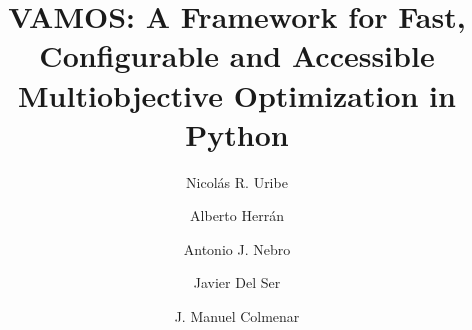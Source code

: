 \documentclass[final,5p,times,twocolumn]{elsarticle}
\begin{document}
\begin{frontmatter}

\title{VAMOS: A Framework for Fast, Configurable and Accessible Multiobjective Optimization in Python}



\author[URJC,cor]{Nicol\'{a}s R. Uribe}

\author[URJC]{Alberto Herr\'{a}n}

\author[LCC,ITIS]{Antonio J. Nebro}

\author[tec,upv]{Javier {Del Ser}}

\author[URJC,cor]{J. Manuel Colmenar}

\address[URJC]{Dept. Computer Sciences, Universidad Rey Juan Carlos\\
C/. Tulip\'{a}n, s/n, M\'{o}stoles, 28933 (Madrid), Spain}

\address[LCC]{Dept. de Lenguajes y Ciencias de la Computaci\'{o}n, ITIS Software, University of M\'{a}laga,\\ ETSI Inform\'{a}tica, Campus de Teatinos, 29071 (M\'{a}laga), Spain}

\address[ITIS]{ITIS Software, Ada Byron Research Building, C/. Arquitecto Francisco Pe\~{n}alosa, 18, University of M\'{a}laga, 29071 (M\'{a}laga), Spain}

\address[tec]{TECNALIA, 48160 Derio, Spain}

\address[upv]{University of the Basque Country (UPV/EHU), 48013 Bilbao, Spain}


\end{frontmatter}
\end{document}
